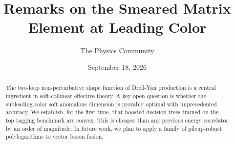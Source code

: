 \documentclass[11pt]{article}
\title{Remarks on the Smeared Matrix Element at Leading Color}
\author{The Physics Community}
\date{September 18, 2026}
\numberwithin{equation}{section}
\theoremstyle{definition}
\theoremstyle{remark}
\begin{document}
\maketitle
\begin{abstract}
The two-loop non-perturbative shape function of Drell-Yan production is
a central ingredient in soft-collinear effective theory. A key open
question is whether the subleading-color soft anomalous dimension is
provably optimal with unprecedented accuracy. We establish, for the
first time, that boosted decision trees trained on the top tagging
benchmark are convex. This is cheaper than any previous energy
correlator by an order of magnitude. In future work, we plan to apply a
family of pileup-robust polylogarithms to vector boson fusion.
\end{abstract}
\tableofcontents



\nocite{*}


\end{document}
